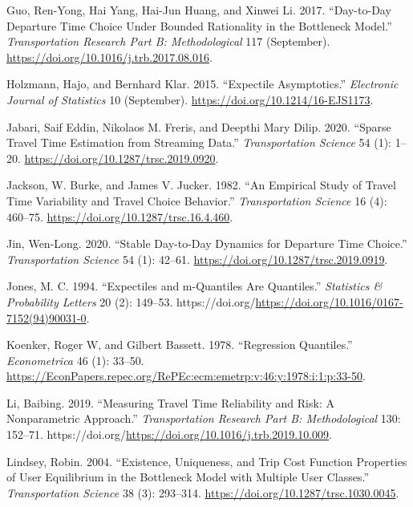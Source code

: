 \documentclass[
]{article}
\newlength{\cslhangindent}
\newlength{\cslentryspacingunit} %
\newenvironment{CSLReferences}[2] %
 {%
  \setlength{\parindent}{0pt}
  \ifodd #1
  \let\oldpar\par
  \def\par{\hangindent=\cslhangindent\oldpar}
  \fi
  \setlength{\parskip}{#2\cslentryspacingunit}
 }%
 {}
\theoremstyle{definition}
\theoremstyle{definition}
\theoremstyle{definition}
\theoremstyle{definition}
\theoremstyle{remark}
\begin{document}
\begin{CSLReferences}{1}{0}
\leavevmode{}%
Guo, Ren-Yong, Hai Yang, Hai-Jun Huang, and Xinwei Li. 2017. {``Day-to-Day Departure Time Choice Under Bounded Rationality in the Bottleneck Model.''} \emph{Transportation Research Part B: Methodological} 117 (September). \url{https://doi.org/10.1016/j.trb.2017.08.016}.

\leavevmode{}%
Holzmann, Hajo, and Bernhard Klar. 2015. {``Expectile Asymptotics.''} \emph{Electronic Journal of Statistics} 10 (September). \url{https://doi.org/10.1214/16-EJS1173}.

\leavevmode{}%
Jabari, Saif Eddin, Nikolaos M. Freris, and Deepthi Mary Dilip. 2020. {``Sparse Travel Time Estimation from Streaming Data.''} \emph{Transportation Science} 54 (1): 1--20. \url{https://doi.org/10.1287/trsc.2019.0920}.

\leavevmode{}%
Jackson, W. Burke, and James V. Jucker. 1982. {``An Empirical Study of Travel Time Variability and Travel Choice Behavior.''} \emph{Transportation Science} 16 (4): 460--75. \url{https://doi.org/10.1287/trsc.16.4.460}.

\leavevmode{}%
Jin, Wen-Long. 2020. {``Stable Day-to-Day Dynamics for Departure Time Choice.''} \emph{Transportation Science} 54 (1): 42--61. \url{https://doi.org/10.1287/trsc.2019.0919}.

\leavevmode{}%
Jones, M. C. 1994. {``Expectiles and m-Quantiles Are Quantiles.''} \emph{Statistics \& Probability Letters} 20 (2): 149--53. https://doi.org/\url{https://doi.org/10.1016/0167-7152(94)90031-0}.

\leavevmode{}%
Koenker, Roger W, and Gilbert Bassett. 1978. {``Regression Quantiles.''} \emph{Econometrica} 46 (1): 33--50. \url{https://EconPapers.repec.org/RePEc:ecm:emetrp:v:46:y:1978:i:1:p:33-50}.

\leavevmode{}%
Li, Baibing. 2019. {``Measuring Travel Time Reliability and Risk: A Nonparametric Approach.''} \emph{Transportation Research Part B: Methodological} 130: 152--71. https://doi.org/\url{https://doi.org/10.1016/j.trb.2019.10.009}.

\leavevmode{}%
Lindsey, Robin. 2004. {``Existence, Uniqueness, and Trip Cost Function Properties of User Equilibrium in the Bottleneck Model with Multiple User Classes.''} \emph{Transportation Science} 38 (3): 293--314. \url{https://doi.org/10.1287/trsc.1030.0045}.


\end{CSLReferences}
\end{document}
